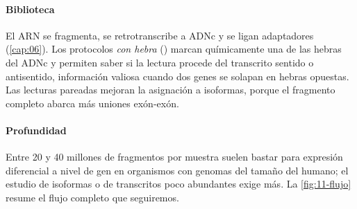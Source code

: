 \paragraph{Biblioteca} El ARN se fragmenta, se retrotranscribe a ADNc y se ligan adaptadores (\cref{cap:06}). Los protocolos \emph{con hebra} () marcan químicamente una de las hebras del ADNc y permiten saber si la lectura procede del transcrito sentido o antisentido, información valiosa cuando dos genes se solapan en hebras opuestas. Las lecturas pareadas mejoran la asignación a isoformas, porque el fragmento completo abarca más uniones exón-exón.

\paragraph{Profundidad} Entre 20 y 40 millones de fragmentos por muestra suelen bastar para expresión diferencial a nivel de gen en organismos con genomas del tamaño del humano; el estudio de isoformas o de transcritos poco abundantes exige más. La \cref{fig:11-flujo} resume el flujo completo que seguiremos.

